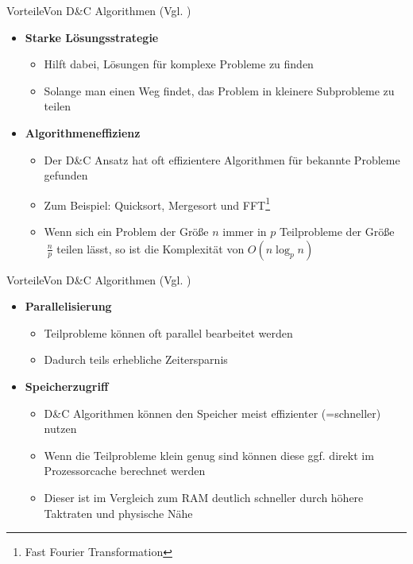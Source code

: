 \begin{frame}{Vorteile}{Von D\&C Algorithmen (Vgl. \cite{wiki:dac})}
    \begin{itemize}
        \item \textbf{Starke Lösungsstrategie}
        \begin{itemize}
            \item Hilft dabei, Lösungen für komplexe Probleme zu finden
            \item Solange man einen Weg findet, das Problem in kleinere Subprobleme zu teilen
        \end{itemize}
        \item \textbf{Algorithmeneffizienz}
        \begin{itemize}
            \item Der D\&C Ansatz hat oft effizientere Algorithmen für bekannte Probleme gefunden
            \item Zum Beispiel: Quicksort, Mergesort und FFT\footnote{Fast Fourier Transformation}
            \item Wenn sich ein Problem der Größe $n$ immer in $p$ Teilprobleme der Größe $~\frac{n}{p}$ teilen lässt, so ist die Komplexität von $O(n\log_p n)$
        \end{itemize}
    \end{itemize}
\end{frame}

\begin{frame}{Vorteile}{Von D\&C Algorithmen (Vgl. \cite{wiki:dac})}
    \begin{itemize}
        \item \textbf{Parallelisierung}
        \begin{itemize}
            \item Teilprobleme können oft parallel bearbeitet werden
            \item Dadurch teils erhebliche Zeitersparnis
        \end{itemize}
        \item \textbf{Speicherzugriff}
        \begin{itemize}
            \item D\&C Algorithmen können den Speicher meist effizienter (=schneller) nutzen
            \item Wenn die Teilprobleme klein genug sind können diese ggf. direkt im Prozessorcache berechnet werden
            \item Dieser ist im Vergleich zum RAM deutlich schneller durch höhere Taktraten und physische Nähe
        \end{itemize}
    \end{itemize}
\end{frame}

